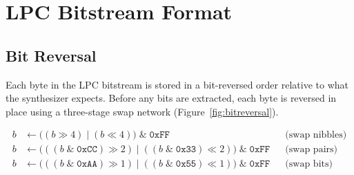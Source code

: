 \documentclass[10pt]{article}
\begin{document}
\section{LPC Bitstream Format}
\label{sec:bitstream}

\subsection{Bit Reversal}

Each byte in the LPC bitstream is stored in a bit-reversed order relative to
what the synthesizer expects.  Before any bits are extracted, each byte is
reversed in place using a three-stage swap network
(Figure~\ref{fig:bitreversal}).

\begin{equation}
\begin{aligned}
b &\leftarrow \bigl((b \gg 4) \mid (b \ll 4)\bigr) \;\&\; \texttt{0xFF}
  &&\text{(swap nibbles)} \\
b &\leftarrow \bigl(((b \;\&\; \texttt{0xCC}) \gg 2)
             \mid ((b \;\&\; \texttt{0x33}) \ll 2)\bigr) \;\&\; \texttt{0xFF}
  &&\text{(swap pairs)} \\
b &\leftarrow \bigl(((b \;\&\; \texttt{0xAA}) \gg 1)
             \mid ((b \;\&\; \texttt{0x55}) \ll 1)\bigr) \;\&\; \texttt{0xFF}
  &&\text{(swap bits)}
\end{aligned}
\label{eq:bitrev}
\end{equation}
\end{document}
